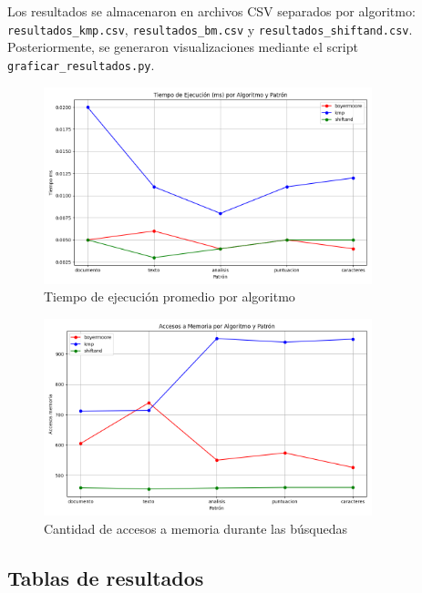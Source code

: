\documentclass[9pt,letterpaper,onecolumn]{rho-class/rho}
\begin{document}
Los resultados se almacenaron en archivos CSV separados por algoritmo: \texttt{resultados\_kmp.csv}, \texttt{resultados\_bm.csv} y \texttt{resultados\_shiftand.csv}. Posteriormente, se generaron visualizaciones mediante el script \texttt{graficar\_resultados.py}.

\begin{figure}[H]
\centering
\includegraphics[width=0.85\textwidth]{grafico_tiempo_ms.png}
\caption{Tiempo de ejecución promedio por algoritmo}
\end{figure}

\begin{figure}[H]
\centering
\includegraphics[width=0.85\textwidth]{grafico_accesos_memoria.png}
\caption{Cantidad de accesos a memoria durante las búsquedas}
\end{figure}

\subsection{Tablas de resultados}
\end{document}
